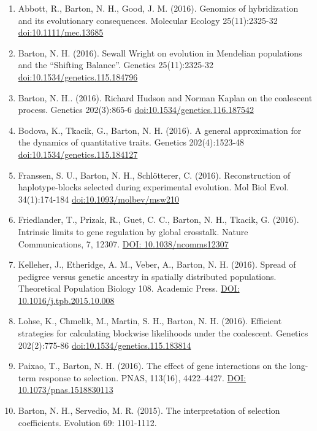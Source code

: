 \documentclass[10pt]{article}
\begin{document}
\begin{cv}
\begin{enumerate}
\item Abbott, R., Barton, N. H., Good, J. M. (2016). Genomics of hybridization and its evolutionary consequences. Molecular Ecology 25(11):2325-32 \href{http://dx.doi.org/10.1111/mec.13685}{doi:10.1111/mec.13685}
\item Barton, N. H. (2016). Sewall Wright on evolution in Mendelian populations and the ``Shifting Balance”. Genetics 25(11):2325-32 
\href{http://dx.doi.org/10.1534/genetics.115.184796}{doi:10.1534/genetics.115.184796}
\item Barton, N. H.. (2016). Richard Hudson and Norman Kaplan on the coalescent process. Genetics 202(3):865-6 
\href{http://dx.doi.org/10.1534/genetics.116.187542}{doi:10.1534/genetics.116.187542}
\item Bodova, K., Tkacik, G., Barton, N. H. (2016). A general approximation for the dynamics of quantitative traits. Genetics 202(4):1523-48 \href{http://dx.doi.org/10.1534/genetics.115.184127}{doi:10.1534/genetics.115.184127}
\item Franssen, S. U., Barton, N. H., Schl\"otterer, C. (2016). Reconstruction of haplotype-blocks selected during experimental evolution. Mol Biol Evol. 34(1):174-184 
\href{http://dx.doi.org/10.1093/molbev/msw210}{doi:10.1093/molbev/msw210}
\item Friedlander, T., Prizak, R., Guet, C. C., Barton, N. H., Tkacik, G. (2016). Intrinsic limits to gene regulation by global crosstalk. Nature Communications, 7, 12307.
\href{https://doi.org/10.1038/ncomms12307}{DOI: 10.1038/ncomms12307}
\item Kelleher, J., Etheridge, A. M., Veber, A., Barton, N. H. (2016). Spread of pedigree versus genetic ancestry in spatially distributed populations. Theoretical Population Biology 108. Academic Press.
\href{https://research-explorer.app.ist.ac.at/record/1631}{DOI: 10.1016/j.tpb.2015.10.008}
\item Lohse, K., Chmelik, M., Martin, S. H., Barton, N. H. (2016). Efficient strategies for calculating blockwise likelihoods under the coalescent. Genetics 202(2):775-86 
\href{http://dx.doi.org/10.1534/genetics.115.183814}{doi:10.1534/genetics.115.183814}
\item Paixao, T., Barton, N. H. (2016). The effect of gene interactions on the long-term response to selection. PNAS, 113(16), 4422–4427.
\href{https://research-explorer.app.ist.ac.at/record/1359}{DOI: 10.1073/pnas.1518830113}
\item Barton, N. H., Servedio, M. R. (2015). The interpretation of selection coefficients. Evolution 69: 1101-1112. 

\end{enumerate}
\end{cv}
\end{document}
